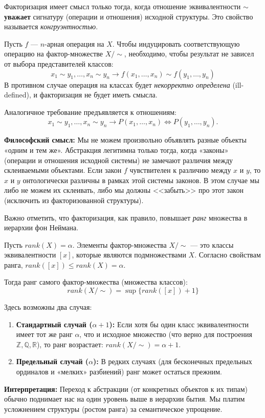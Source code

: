 \documentclass[11pt, a4paper]{extarticle}
\newcommand{\Z}{{\mathbb Z}}
\newcommand{\R}{{\mathbb R}}
\newcommand{\Q}{{\mathbb Q}}
\renewcommand{\le}{\leqslant}
\begin{document}
\begin{remark}
    Факторизация имеет смысл только тогда, когда отношение эквивалентности $\sim$ \textbf{уважает} сигнатуру (операции и отношения) исходной структуры. Это свойство называется \textit{конгруэнтностью}.
    
    Пусть $f$ — $n$-арная операция на $X$. Чтобы индуцировать соответствующую операцию на фактор-множестве $X/{\sim}$, необходимо, чтобы результат не зависел от выбора представителей классов:
    $$ x_1 \sim y_1, \dots, x_n \sim y_n \to f(x_1, \dots, x_n) \sim f(y_1, \dots, y_n) $$
    В противном случае операция на классах будет \textit{некорректно определена} (ill-defined), и факторизация не будет иметь смысла.

    Аналогичное требование предъявляется к отношениям:
    $$ x_1 \sim y_1, \dots, x_n \sim y_n \to P(x_1, \dots, x_n) \iff P(y_1, \dots, y_n).$$
    
    \textbf{Философский смысл:} Мы не можем произвольно объявлять разные объекты «одним и тем же». Абстракция легитимна только тогда, когда «законы» (операции и отношения исходной системы) не замечают различия между склеиваемыми объектами. Если закон $f$ чувствителен к различию между $x$ и $y$, то $x$ и $y$ онтологически различны в рамках этой системы законов. В этом случае мы либо не можем их склеивать, либо мы должны <<забыть>> про этот закон (исключить из факторизованной структуры).
    \end{remark}


\begin{remark}
    Важно отметить, что факторизация, как правило, повышает \textit{ранг} множества в иерархии фон Неймана.
    
    Пусть $rank(X) = \alpha$. Элементы фактор-множества $X/{\sim}$ — это классы эквивалентности $[x]$, которые являются подмножествами $X$.
    Согласно свойствам ранга, $rank([x]) \le rank(X) = \alpha$.
    
    Тогда ранг самого фактор-множества (множества классов):
    $$ rank(X/{\sim}) = \sup \{rank([x]) + 1\} $$
    
    Здесь возможны два случая:
    \begin{enumerate}
        \item \textbf{Стандартный случай ($\alpha + 1$):} Если хотя бы один класс эквивалентности имеет тот же ранг $\alpha$, что и исходное множество (что верно для построения $\Z, \Q, \R$), то ранг возрастает: $rank(X/{\sim}) = \alpha + 1$.
        \item \textbf{Предельный случай ($\alpha$):} В редких случаях (для бесконечных предельных ординалов и «мелких» разбиений) ранг может остаться прежним.
    \end{enumerate}
    
    \textbf{Интерпретация:} Переход к абстракции (от конкретных объектов к их типам) обычно поднимает нас на один уровень выше в иерархии бытия. Мы платим усложнением структуры (ростом ранга) за семантическое упрощение.
    \end{remark}
\end{document}
